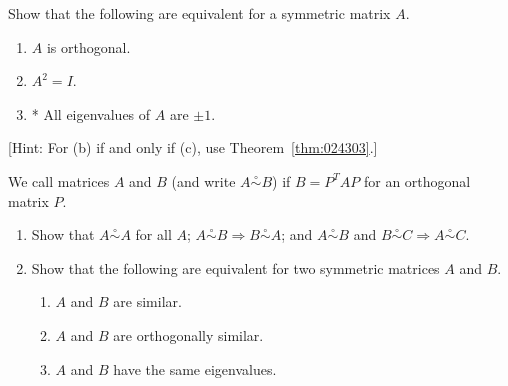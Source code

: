 \documentclass{ximera}
\begin{document}
\begin{problem}\label{prob:ortho15a}
Show that the following are equivalent for a symmetric matrix $A$.


\begin{enumerate}
\item $A$ is orthogonal.
\item $A^{2} = I$.
\item* All eigenvalues of $A$ are $\pm 1$.
\end{enumerate}
[Hint: For (b) if and only if (c), use Theorem~\ref{thm:024303}.]



\end{problem}


\begin{problem}\label{ex:8_2_12}
We call matrices $A$ and $B$  (and write $A \stackrel{\circ}{\sim} B$) if $B = P^{T}AP$ for an orthogonal matrix $P$.


\begin{enumerate}
\item Show that $A \stackrel{\circ}{\sim} A$ for all $A$; $A \stackrel{\circ}{\sim} B \Rightarrow B \stackrel{\circ}{\sim} A$; and $A \stackrel{\circ}{\sim} B$ and $B \stackrel{\circ}{\sim} C \Rightarrow A \stackrel{\circ}{\sim} C$.

\item Show that the following are equivalent for two symmetric matrices $A$ and $B$.


\begin{enumerate}
\item $A$ and $B$ are similar.

\item $A$ and $B$ are orthogonally similar.

\item $A$ and $B$ have the same eigenvalues.

\end{enumerate}
\end{enumerate}
\end{problem}
\end{document}

